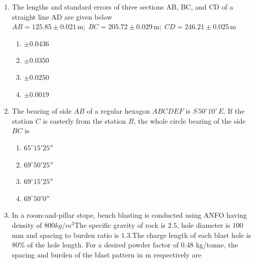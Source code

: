 \documentclass[journal,12pt,onecolumn]{IEEEtran}
\theoremstyle{remark}
\begin{document}
\begin{enumerate}
\item The lengths and standard errors of three sections AB, BC, and CD of a straight line AD are given
below
$AB = 125.85 \pm 0.021 \,\text{m}; \; 
BC = 205.72 \pm 0.029 \,\text{m}; \; 
CD = 246.21 \pm 0.025 \,\text{m}$

\hfill{}
\begin{multicols}{4}
\begin{enumerate}
\item $\pm 0.0436$
\item $\pm 0.0350$
\item $\pm 0.0250$
\item $\pm 0.0019$
\end{enumerate}
\end{multicols}

\item  The bearing of side $AB$ of a regular hexagon $ABCDEF$ is $S \, 50^{\circ}10' \, E$. If the station $C$ is easterly from the station $B$, the whole circle bearing of the side $BC$ is  

\hfill{}
\begin{multicols}{4}
\begin{enumerate}
\item $65^{\circ}15'25''$
\item $69^{\circ}50'25''$ 
\item $69^{\circ}15'25''$
\item $69^{\circ}50'0''$
\end{enumerate}
\end{multicols}

\item  In a room-and-pillar stope, bench blasting is conducted using ANFO having density of $800 kg/m^3$The specific gravity of rock is $2.5$, hole diameter is $100$ mm and spacing to burden ratio is $1.3$.The
charge length of each blast hole is 80\% of the hole length. For a desired powder factor of 0.48 kg/tonne, the spacing and burden of the blast pattern in m respectively are


\end{enumerate}
\end{document}
